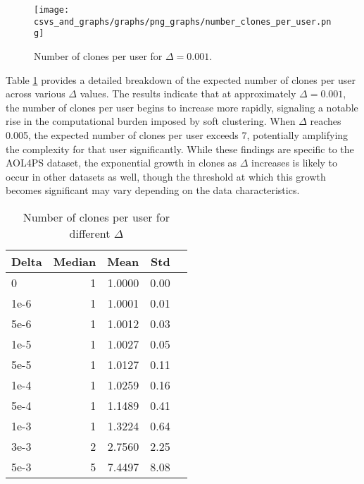 \documentclass[10pt,journal]{IEEEtran}
\begin{document}
%         
\begin{figure}
    \centering
    \texttt{[image: csvs\_and\_graphs/graphs/png\_graphs/number\_clones\_per\_user.png]}
    \caption{Number of clones per user for $\Delta = 0.001$.}
    \label{fig:cc/clones_per_user}
\end{figure}



Table \ref{tab:nbr_clones_per_user_for_different_delta} provides a detailed breakdown of the expected number of clones per user across various $\Delta$ values. The results indicate that at approximately $\Delta = 0.001$, the number of clones per user begins to increase more rapidly, signaling a notable rise in the computational burden imposed by soft clustering. When $\Delta$ reaches 0.005, the expected number of clones per user exceeds 7, potentially amplifying the complexity for that user significantly. While these findings are specific to the AOL4PS dataset, the exponential growth in clones as $\Delta$ increases is likely to occur in other datasets as well, though the threshold at which this growth becomes significant may vary depending on the data characteristics.

\begin{table}[h!]
    \centering
    \caption{Number of clones per user for different $\Delta$}
    \label{tab:nbr_clones_per_user_for_different_delta}
    \begin{tabular}{lrrrr}
        \toprule
        \textbf{Delta} & \textbf{Median} & \textbf{Mean} & \textbf{Std} \\
        \midrule
         0 & 1 & 1.0000 & 0.00 \\
         1e-6 & 1 & 1.0001 & 0.01 \\
         5e-6 & 1 & 1.0012 & 0.03 \\
         1e-5 & 1 & 1.0027 & 0.05 \\
         5e-5 & 1 & 1.0127 & 0.11 \\
         1e-4 & 1 & 1.0259 & 0.16 \\
         5e-4 & 1 & 1.1489 & 0.41 \\
         1e-3 & 1 & 1.3224 & 0.64 \\
         3e-3 & 2 & 2.7560 & 2.25 \\
         5e-3 & 5 & 7.4497 & 8.08 \\
        \bottomrule
    \end{tabular}
\end{table}
\end{document}
